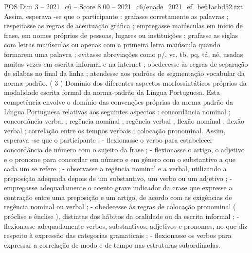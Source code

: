 \begin{textsample}{POS Dim 3 – 2021\_c6 – Score 8.00 – 2021\_c6/enade\_2021\_ef\_be61acbd52.txt}
Assim, esperava -se que o participante : grafasse corretamente as palavras ; respeitasse as regras de acentuação gráfica ; empregasse maiúsculas em início de frase, em nomes próprios de pessoas, lugares ou instituições ; grafasse as siglas com letras maiúsculas ou apenas com a primeira letra maiúscula quando formarem uma palavra ; evitasse abreviações como p/, vc, tb, pq, tá, né, usadas muitas vezes em escrita informal e na internet ; obedecesse às regras de separação de sílabas no final da linha ; atendesse aos padrões de segmentação vocabular da norma-padrão. ( 3 ) Domínio dos diferentes aspectos morfossintáticos próprios da modalidade escrita formal da norma-padrão da Língua Portuguesa.
Esta competência envolve o domínio das convenções próprias da norma padrão da Língua Portuguesa relativas aos seguintes aspectos : concordância nominal ; concordância verbal ; regência nominal ; regência verbal ; flexão nominal ; flexão verbal ; correlação entre os tempos verbais ; colocação pronominal.
Assim, esperava -se que o participante : - flexionasse o verbo para estabelecer concordância de número com o sujeito da frase ; - flexionasse o artigo, o adjetivo e o pronome para concordar em número e em gênero com o substantivo a que cada um se refere ; - observasse a regência nominal e a verbal, utilizando a preposição adequada depois de um substantivo, um verbo ou um adjetivo ; - empregasse adequadamente o acento grave indicador da crase que expresse a contração entre uma preposição e um artigo, de acordo com as exigências de regência nominal ou verbal ; - obedecesse às regras de colocação pronominal ( próclise e ênclise ), distintas dos hábitos da oralidade ou da escrita informal ; - flexionasse adequadamente verbos, substantivos, adjetivos e pronomes, no que diz respeito à expressão das categorias gramaticais ; - flexionasse os verbos para expressar a correlação de modo e de tempo nas estruturas subordinadas.

\end{textsample}
